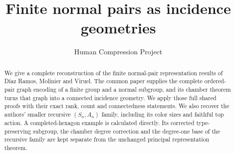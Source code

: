 
\title{Finite normal pairs as incidence geometries}
\author{Human Compression Project}
\date{}

\maketitle
\begin{abstract}
We give a complete reconstruction of the finite normal-pair representation
results of D\'iaz Ramos, Molinier and Viruel. The common paper supplies the complete ordered-pair graph
encoding of a finite group and a normal subgroup, and its chamber theorem
turns that graph into a connected incidence geometry. We apply those full
shared proofs with their exact rank, count and connectedness statements. We also recover the authors'
smaller recursive $(S_n,A_n)$ family, including its color sizes and faithful
top action. A completed-hexagon example is calculated directly. Its corrected
type-preserving subgroup, the chamber degree correction and the degree-one
base of the recursive family are kept separate from the unchanged principal
representation theorem.
\end{abstract}





